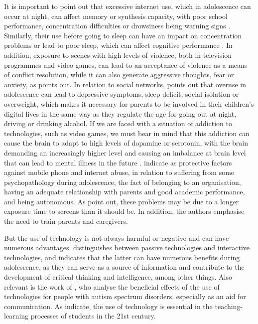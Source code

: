 \documentclass[english]{textolivre}
\begin{document}
It is important to point out that excessive internet use, which in adolescence can occur at night, can affect memory or synthesis capacity, with poor school performance, concentration difficulties or drowsiness being warning signs \cite{cerisola2017impacto}. %
Similarly, their use before going to sleep can have an impact on concentration problems or lead to poor sleep, which can affect cognitive performance \cite{russi2021,cerisola2017impacto,pin2019sueno}. %
In addition, exposure to scenes with high levels of violence, both in television programmes and video games, can lead to an acceptance of violence as a means of conflict resolution, while it can also generate aggressive thoughts, fear or anxiety, as \textcite{russi2021} %
points out. In relation to social networks, \textcite{cerisola2017impacto} %
points out that overuse in adolescence can lead to depressive symptoms, sleep deficit, social isolation or overweight, which makes it necessary for parents to be involved in their children's digital lives in the same way as they regulate the age for going out at night, driving or drinking alcohol. If we are faced with a situation of addiction to technologies, such as video games, we must bear in mind that this addiction can cause the brain to adapt to high levels of dopamine or serotonin, with the brain demanding an increasingly higher level and causing an imbalance at brain level that can lead to mental illness in the future \cite{dealvarado2019trastornos}. %
\textcite{vicente2019adiccion} %
indicate as protective factors against mobile phone and internet abuse, in relation to suffering from some psychopathology during adolescence, the fact of belonging to an organisation, having an adequate relationship with parents and good academic performance, and being autonomous. As \textcite{fungfallas2020impacto} %
point out, these problems may be due to a longer exposure time to screens than it should be. In addition, the authors emphasise the need to train parents and caregivers.

But the use of technology is not always harmful or negative and can have numerous advantages. \textcite{cerisola2017impacto} %
distinguishes between passive technologies and interactive technologies, and indicates that the latter can have numerous benefits during adolescence, as they can serve as a source of information and contribute to the development of critical thinking and intelligence, among other things. Also relevant is the work of \textcite{guzman2017nuevas}, %
who analyse the beneficial effects of the use of technologies for people with autism spectrum disorders, especially as an aid for communication. As \textcite{alonso2021tecnologia} %
indicate, the use of technology is essential in the teaching-learning processes of students in the 21st century.
\end{document}
